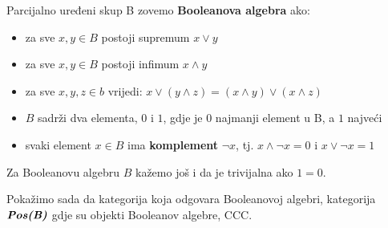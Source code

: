   \begin{definition}
    Parcijalno uređeni skup B zovemo \textbf{Booleanova algebra} ako:
    \begin{itemize}
      \item za sve $x, y \in B$ postoji supremum $x \vee y$
      \item za sve $x, y \in B$ postoji infimum $x \wedge y$
      \item za sve $x, y, z \in b$ vrijedi: $x \vee (y \wedge z) = (x \wedge y) \vee (x \wedge z)$
      \item $B$ sadrži dva elementa, $0$ i $1$, gdje je $0$ najmanji element u B, a $1$ najveći
      \item svaki element $x \in B$ ima \textbf{komplement} $\neg x$, tj. $x \wedge \neg x = 0$ i $x \vee \neg x = 1$
    \end{itemize}
      Za Booleanovu algebru $B$ kažemo još i da je trivijalna ako $1 = 0$.
    \end{definition}
  Pokažimo sada da kategorija koja odgovara Booleanovoj algebri, kategorija $\textbf{\emph{Pos(B)}}$ gdje su objekti Booleanov algebre, CCC. 
